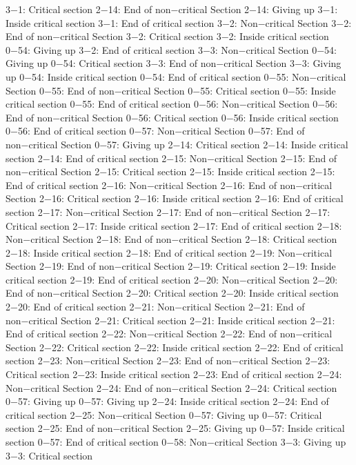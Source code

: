 3−1: Critical section
2−14: End of non−critical Section
2−14: Giving up
3−1: Inside critical section
3−1: End of critical section
3−2: Non−critical Section
3−2: End of non−critical Section
3−2: Critical section
3−2: Inside critical section
0−54: Giving up
3−2: End of critical section
3−3: Non−critical Section
0−54: Giving up
0−54: Critical section
3−3: End of non−critical Section
3−3: Giving up
0−54: Inside critical section
0−54: End of critical section
0−55: Non−critical Section
0−55: End of non−critical Section
0−55: Critical section
0−55: Inside critical section
0−55: End of critical section
0−56: Non−critical Section
0−56: End of non−critical Section
0−56: Critical section
0−56: Inside critical section
0−56: End of critical section
0−57: Non−critical Section
0−57: End of non−critical Section
0−57: Giving up
2−14: Critical section
2−14: Inside critical section
2−14: End of critical section
2−15: Non−critical Section
2−15: End of non−critical Section
2−15: Critical section
2−15: Inside critical section
2−15: End of critical section
2−16: Non−critical Section
2−16: End of non−critical Section
2−16: Critical section
2−16: Inside critical section
2−16: End of critical section
2−17: Non−critical Section
2−17: End of non−critical Section
2−17: Critical section
2−17: Inside critical section
2−17: End of critical section
2−18: Non−critical Section
2−18: End of non−critical Section
2−18: Critical section
2−18: Inside critical section
2−18: End of critical section
2−19: Non−critical Section
2−19: End of non−critical Section
2−19: Critical section
2−19: Inside critical section
2−19: End of critical section
2−20: Non−critical Section
2−20: End of non−critical Section
2−20: Critical section
2−20: Inside critical section
2−20: End of critical section
2−21: Non−critical Section
2−21: End of non−critical Section
2−21: Critical section
2−21: Inside critical section
2−21: End of critical section
2−22: Non−critical Section
2−22: End of non−critical Section
2−22: Critical section
2−22: Inside critical section
2−22: End of critical section
2−23: Non−critical Section
2−23: End of non−critical Section
2−23: Critical section
2−23: Inside critical section
2−23: End of critical section
2−24: Non−critical Section
2−24: End of non−critical Section
2−24: Critical section
0−57: Giving up
0−57: Giving up
2−24: Inside critical section
2−24: End of critical section
2−25: Non−critical Section
0−57: Giving up
0−57: Critical section
2−25: End of non−critical Section
2−25: Giving up
0−57: Inside critical section
0−57: End of critical section
0−58: Non−critical Section
3−3: Giving up
3−3: Critical section

